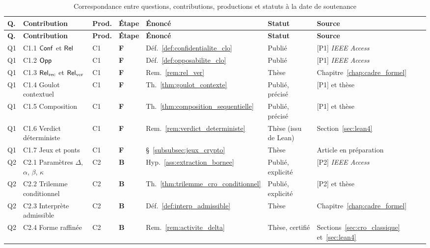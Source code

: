 \begin{sloppypar}
{\footnotesize
\begin{longtable}{p{0.6cm}p{3.1cm}p{0.8cm}p{0.6cm}p{1.1cm}p{2.3cm}p{3.6cm}}
\caption{Correspondance entre questions, contributions, productions et statuts \`a la date de soutenance}
\label{tab:contributions_these}\\
\toprule
\textbf{Q.} & \textbf{Contribution} & \textbf{Prod.} & \textbf{\'Etape} & \textbf{\'Enonc\'e} & \textbf{Statut} & \textbf{Source} \\
\midrule
\endfirsthead
\toprule
\textbf{Q.} & \textbf{Contribution} & \textbf{Prod.} & \textbf{\'Etape} & \textbf{\'Enonc\'e} & \textbf{Statut} & \textbf{Source} \\
\midrule
\endhead
Q1 & C1.1 $\mathsf{Conf}$ et $\mathsf{Rel}$ & C1 & \textbf{F} & D\'ef.~\ref{def:confidentialite_clo} & Publi\'e & [P1] \textit{IEEE Access}~\cite{MINKA2026CLO} \\
Q1 & C1.2 $\mathsf{Opp}$ & C1 & \textbf{F} & D\'ef.~\ref{def:opposabilite_clo} & Publi\'e & [P1] \textit{IEEE Access}~\cite{MINKA2026CLO} \\
Q1 & C1.3 $\mathsf{Rel}_{\mathrm{rec}}$ et $\mathsf{Rel}_{\mathrm{ver}}$ & C1 & \textbf{F} & Rem.~\ref{rem:rel_ver} & Th\`ese & Chapitre~\ref{chap:cadre_formel} \\
Q1 & C1.4 Goulot contextuel & C1 & \textbf{F} & Th.~\ref{thm:goulot_contexte} & Publi\'e, pr\'ecis\'e & [P1] et th\`ese \\
Q1 & C1.5 Composition & C1 & \textbf{F} & Th.~\ref{thm:composition_sequentielle} & Publi\'e, pr\'ecis\'e & [P1] et th\`ese \\
Q1 & C1.6 Verdict d\'eterministe & C1 & \textbf{F} & Rem.~\ref{rem:verdict_deterministe} & Th\`ese (issu de Lean) & Section~\ref{sec:lean4} \\
Q1 & C1.7 Jeux et ponts & C1 & \textbf{F} & \S~\ref{subsubsec:jeux_crypto} & Th\`ese & Article en pr\'eparation \\
Q2 & C2.1 Param\`etres $\Delta$, $\alpha$, $\beta$, $\kappa$ & C2 & \textbf{B} & Hyp.~\ref{ass:extraction_bornee} & Publi\'e, explicit\'e & [P2] \textit{IEEE Access}~\cite{MINKA2026CRO} \\
Q2 & C2.2 Trilemme conditionnel & C2 & \textbf{B} & Th.~\ref{thm:trilemme_cro_conditionnel} & Publi\'e, explicit\'e & [P2] et th\`ese \\
Q2 & C2.3 Interpr\`ete admissible & C2 & \textbf{B} & D\'ef.~\ref{def:interp_admissible} & Th\`ese & Chapitre~\ref{chap:cadre_formel} \\
Q2 & C2.4 Forme raffin\'ee & C2 & \textbf{B} & Rem.~\ref{rem:activite_delta} & Th\`ese, certifi\'e & Sections~\ref{sec:cro_classique} et~\ref{sec:lean4} \\

\end{longtable}}
\end{sloppypar}

